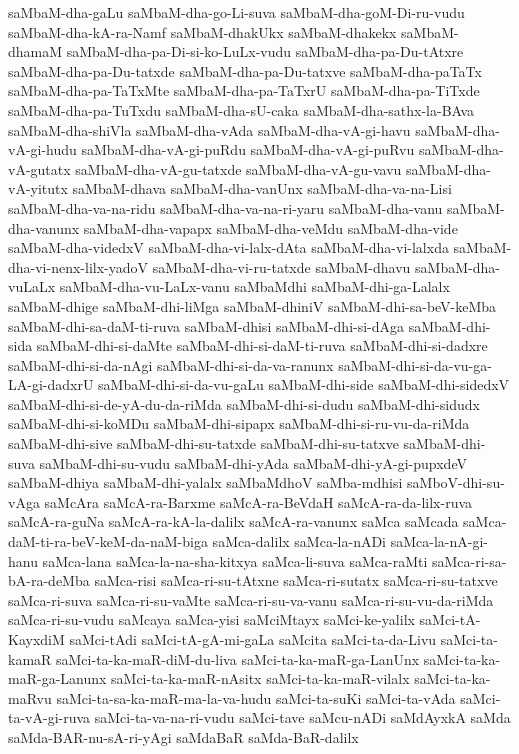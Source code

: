 {saMbaM-dha-gaLu
saMbaM-dha-go-Li-suva
saMbaM-dha-goM-Di-ru-vudu
saMbaM-dha-kA-ra-Namf
saMbaM-dhakUkx
saMbaM-dhakekx
saMbaM-dhamaM
saMbaM-dha-pa-Di-si-ko-LuLx-vudu
saMbaM-dha-pa-Du-tAtxre
saMbaM-dha-pa-Du-tatxde
saMbaM-dha-pa-Du-tatxve
saMbaM-dha-paTaTx
saMbaM-dha-pa-TaTxMte
saMbaM-dha-pa-TaTxrU
saMbaM-dha-pa-TiTxde
saMbaM-dha-pa-TuTxdu
saMbaM-dha-sU-caka
saMbaM-dha-sathx-la-BAva
saMbaM-dha-shiVla
saMbaM-dha-vAda
saMbaM-dha-vA-gi-havu
saMbaM-dha-vA-gi-hudu
saMbaM-dha-vA-gi-puRdu
saMbaM-dha-vA-gi-puRvu
saMbaM-dha-vA-gutatx
saMbaM-dha-vA-gu-tatxde
saMbaM-dha-vA-gu-vavu
saMbaM-dha-vA-yitutx
saMbaM-dhava
saMbaM-dha-vanUnx
saMbaM-dha-va-na-Lisi
saMbaM-dha-va-na-ridu
saMbaM-dha-va-na-ri-yaru
saMbaM-dha-vanu
saMbaM-dha-vanunx
saMbaM-dha-vapapx
saMbaM-dha-veMdu
saMbaM-dha-vide
saMbaM-dha-videdxV
saMbaM-dha-vi-lalx-dAta
saMbaM-dha-vi-lalxda
saMbaM-dha-vi-nenx-lilx-yadoV
saMbaM-dha-vi-ru-tatxde
saMbaM-dhavu
saMbaM-dha-vuLaLx
saMbaM-dha-vu-LaLx-vanu
saMbaMdhi
saMbaM-dhi-ga-Lalalx
saMbaM-dhige
saMbaM-dhi-liMga
saMbaM-dhiniV
saMbaM-dhi-sa-beV-keMba
saMbaM-dhi-sa-daM-ti-ruva
saMbaM-dhisi
saMbaM-dhi-si-dAga
saMbaM-dhi-sida
saMbaM-dhi-si-daMte
saMbaM-dhi-si-daM-ti-ruva
saMbaM-dhi-si-dadxre
saMbaM-dhi-si-da-nAgi
saMbaM-dhi-si-da-va-ranunx
saMbaM-dhi-si-da-vu-ga-LA-gi-dadxrU
saMbaM-dhi-si-da-vu-gaLu
saMbaM-dhi-side
saMbaM-dhi-sidedxV
saMbaM-dhi-si-de-yA-du-da-riMda
saMbaM-dhi-si-dudu
saMbaM-dhi-sidudx
saMbaM-dhi-si-koMDu
saMbaM-dhi-sipapx
saMbaM-dhi-si-ru-vu-da-riMda
saMbaM-dhi-sive
saMbaM-dhi-su-tatxde
saMbaM-dhi-su-tatxve
saMbaM-dhi-suva
saMbaM-dhi-su-vudu
saMbaM-dhi-yAda
saMbaM-dhi-yA-gi-pupxdeV
saMbaM-dhiya
saMbaM-dhi-yalalx
saMbaMdhoV
saMba-mdhisi
saMboV-dhi-su-vAga
saMcAra
saMcA-ra-Barxme
saMcA-ra-BeVdaH
saMcA-ra-da-lilx-ruva
saMcA-ra-guNa
saMcA-ra-kA-la-dalilx
saMcA-ra-vanunx
saMca
saMcada
saMca-daM-ti-ra-beV-keM-da-naM-biga
saMca-dalilx
saMca-la-nADi
saMca-la-nA-gi-hanu
saMca-lana
saMca-la-na-sha-kitxya
saMca-li-suva
saMca-raMti
saMca-ri-sa-bA-ra-deMba
saMca-risi
saMca-ri-su-tAtxne
saMca-ri-sutatx
saMca-ri-su-tatxve
saMca-ri-suva
saMca-ri-su-vaMte
saMca-ri-su-va-vanu
saMca-ri-su-vu-da-riMda
saMca-ri-su-vudu
saMcaya
saMca-yisi
saMciMtayx
saMci-ke-yalilx
saMci-tA-KayxdiM
saMci-tAdi
saMci-tA-gA-mi-gaLa
saMcita
saMci-ta-da-Livu
saMci-ta-kamaR
saMci-ta-ka-maR-diM-du-liva
saMci-ta-ka-maR-ga-LanUnx
saMci-ta-ka-maR-ga-Lanunx
saMci-ta-ka-maR-nAsitx
saMci-ta-ka-maR-vilalx
saMci-ta-ka-maRvu
saMci-ta-sa-ka-maR-ma-la-va-hudu
saMci-ta-suKi
saMci-ta-vAda
saMci-ta-vA-gi-ruva
saMci-ta-va-na-ri-vudu
saMci-tave
saMcu-nADi
saMdAyxkA
saMda
saMda-BAR-nu-sA-ri-yAgi
saMdaBaR
saMda-BaR-dalilx
}
